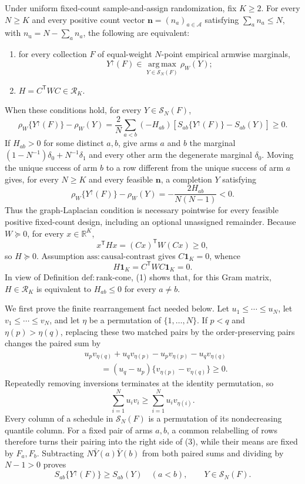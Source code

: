 Under uniform fixed-count sample-and-assign randomization, fix \(K\geq2\).  For every \(N\geq K\) and every positive count vector \(\mathbf n=(n_a)_{a\in\mathcal A}\) satisfying \(\sum_a n_a\leq N\), with \(n_{\mathrm u}=N-\sum_a n_a\), the following are equivalent:
\begin{enumerate}
\item for every collection \(F\) of equal-weight \(N\)-point empirical armwise marginals,
\[
Y^{\uparrow}(F)\in\operatorname*{arg\,max}_{Y\in\mathcal S_N(F)}\rho_W(Y);
\]
\item \(H=C^{\mathsf T}WC\in\mathcal R_K\).
\end{enumerate}
When these conditions hold, for every \(Y\in\mathcal S_N(F)\),
\[
\rho_W\{Y^{\uparrow}(F)\}-\rho_W(Y)
=\frac{2}{N}\sum_{a<b}(-H_{ab})
\left[S_{ab}\{Y^{\uparrow}(F)\}-S_{ab}(Y)\right]\geq0.
\]
If \(H_{ab}>0\) for some distinct \(a,b\), give arms \(a\) and \(b\) the marginal \((1-N^{-1})\delta_0+N^{-1}\delta_1\) and every other arm the degenerate marginal \(\delta_0\).  Moving the unique success of arm \(b\) to a row different from the unique success of arm \(a\) gives, for every \(N\geq K\) and every feasible \(\mathbf n\), a completion \(Y\) satisfying
\[
\rho_W\{Y^{\uparrow}(F)\}-\rho_W(Y)
=-\frac{2H_{ab}}{N(N-1)}<0.
\]
Thus the graph-Laplacian condition is necessary pointwise for every feasible positive fixed-count design, including an optional unassigned remainder.
Because \(W\succeq0\), for every \(x\in\mathbb R^K\),
\[
x^{\mathsf T}Hx=(Cx)^{\mathsf T}W(Cx)\geq0,
\]
so \(H\succeq0\).  Assumption \(\mathrm{ass{:}causal\text{-}contrast}\) gives \(C\mathbf 1_K=0\), whence
\[
H\mathbf 1_K=C^{\mathsf T}WC\mathbf 1_K=0. \tag{1}
\]
In view of Definition \(\mathrm{def{:}rank\text{-}cone}\), (1) shows that, for this Gram matrix, \(H\in\mathcal R_K\) is equivalent to \(H_{ab}\leq0\) for every \(a\ne b\).

We first prove the finite rearrangement fact needed below.  Let \(u_1\leq\cdots\leq u_N\), let \(v_1\leq\cdots\leq v_N\), and let \(\eta\) be a permutation of \(\{1,\ldots,N\}\).  If \(p<q\) and \(\eta(p)>\eta(q)\), replacing these two matched pairs by the order-preserving pairs changes the paired sum by
\[
\begin{aligned}
&u_pv_{\eta(q)}+u_qv_{\eta(p)}
-u_pv_{\eta(p)}-u_qv_{\eta(q)}\\
&\qquad=(u_q-u_p)\{v_{\eta(p)}-v_{\eta(q)}\}\geq0. \tag{2}
\end{aligned}
\]
Repeatedly removing inversions terminates at the identity permutation, so
\[
\sum_{i=1}^N u_iv_i\geq\sum_{i=1}^N u_iv_{\eta(i)}. \tag{3}
\]
Every column of a schedule in \(\mathcal S_N(F)\) is a permutation of its nondecreasing quantile column.  For a fixed pair of arms \(a,b\), a common relabelling of rows therefore turns their pairing into the right side of (3), while their means are fixed by \(F_a,F_b\).  Subtracting \(N\bar Y(a)\bar Y(b)\) from both paired sums and dividing by \(N-1>0\) proves
\[
S_{ab}\{Y^{\uparrow}(F)\}\geq S_{ab}(Y)
\quad(a<b),\qquad Y\in\mathcal S_N(F). \tag{4}
\]

